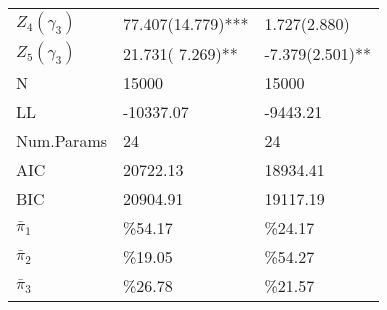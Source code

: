 \begin{tabular}{lll}
  $Z_4 (\gamma_{3})$ &    77.407(14.779)*** &     1.727(2.880)    \\ 
  $Z_5 (\gamma_{3})$ &    21.731( 7.269)**  &    -7.379(2.501)**  \\ 
  N & 15000 & 15000 \\ 
  LL & -10337.07 & -9443.21 \\ 
  Num.Params & 24 & 24 \\ 
  AIC & 20722.13 & 18934.41 \\ 
  BIC & 20904.91 & 19117.19 \\ 
  $\bar{\pi}_{1}$ & \%54.17 & \%24.17 \\ 
  $\bar{\pi}_{2}$ & \%19.05 & \%54.27 \\ 
  $\bar{\pi}_{3}$ & \%26.78 & \%21.57 \\ 
   \hline
\end{tabular}

